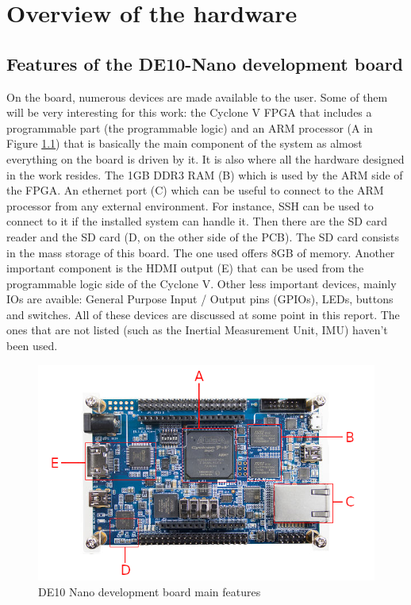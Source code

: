\chapter{Overview of the hardware}

\section{Features of the DE10-Nano development board}

On the board, numerous devices are made available to the user. Some of them will be very 
interesting for this work: the Cyclone V FPGA that includes a programmable part (the programmable 
logic) and an ARM processor (A in Figure \ref{fig:de10/de10_features}) that is
basically the main component of the system as almost everything on the board is driven by it. It is
also where all the hardware designed in the work resides. The 1GB DDR3 RAM (B) which is used 
by the ARM side of the FPGA. An ethernet port (C) which can be
useful to connect to the ARM processor from any external environment. For instance, SSH can be used
to connect to it if the installed system can handle it. Then there are the SD card reader and the SD 
card (D, on the other side of the PCB). The SD card consists in the mass storage of this board. The
one used offers 8GB of memory. Another important component is the HDMI output (E) that can be used
from the programmable logic side of the Cyclone V. Other less important devices, mainly IOs are 
avaible: General Purpose Input / Output pins (GPIOs), LEDs, buttons and switches. All of these 
devices are discussed at some point in this report. The ones that are not listed (such as the Inertial
Measurement Unit, IMU) haven't been used.

\begin{figure}[H]
    \centering
    \includegraphics[scale=0.5]{Chapter1-Hardware/res/de10_nano.png}
    \caption{DE10 Nano development board main features}
    \label{fig:de10/de10_features}
\end{figure}


